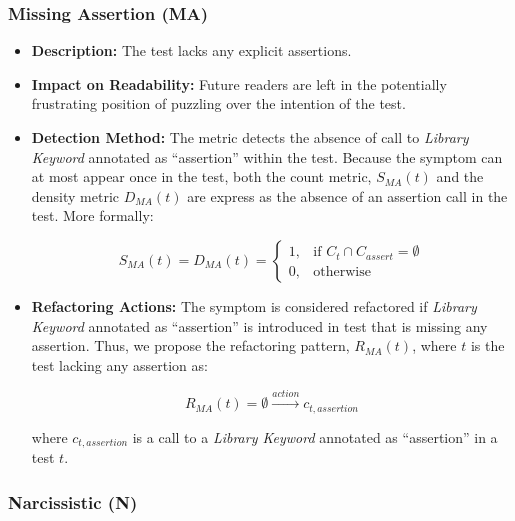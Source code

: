\subsubsection{Missing Assertion (MA)}

\begin{itemize}
    \item \textbf{Description:} The test lacks any explicit assertions.

    \item \textbf{Impact on Readability:} Future readers are left in the potentially frustrating position of puzzling over the intention of the test.
    
    \item \textbf{Detection Method:} The metric detects the absence of call to \emph{Library Keyword} annotated as ``assertion'' within the test. Because the symptom can at most appear once in the test, both the count metric, $S_{MA}(t)$ and the density metric $D_{MA}(t)$ are express as the absence of an assertion call in the test. More formally:
    
    \begin{equation*}
        S_{MA}(t) = D_{MA}(t) = 
        \begin{cases}
            1,   & \text{if } C_{t} \cap C_{assert} = \emptyset\\
            0,   & \text{otherwise}
        \end{cases}
    \end{equation*}
    
    \item \textbf{Refactoring Actions:} The symptom is considered refactored if \emph{Library Keyword} annotated as ``assertion'' is introduced in test that is missing any assertion. Thus, we propose the refactoring pattern, $R_{MA}(t)$, where $t$ is the test lacking any assertion as:
    
    \begin{equation*}
        R_{MA}(t) = \emptyset \xrightarrow{action} c_{t, assertion}
    \end{equation*}
    
    where $c_{t, assertion}$ is a call to a \emph{Library Keyword} annotated as ``assertion'' in a test $t$.
\end{itemize}

\subsubsection{Narcissistic (N)}

